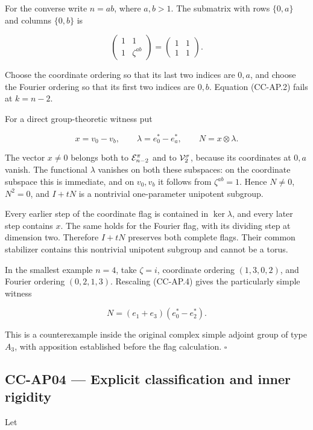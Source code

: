 \documentclass[11pt,a4paper]{article}
\theoremstyle{definition}\newtheorem{definition}[theorem]{Definition}
\theoremstyle{remark}\newtheorem{remark}[theorem]{Remark}
\begin{document}
For the converse write \(n=ab\), where \(a,b>1\). The submatrix with
rows \(\{0,a\}\) and columns \(\{0,b\}\) is

\[
 \begin{pmatrix}1&1\\1&\zeta^{ab}\end{pmatrix}
 =\begin{pmatrix}1&1\\1&1\end{pmatrix}.
\]

Choose the coordinate ordering so that its last two indices are \(0,a\),
and choose the Fourier ordering so that its first two indices are
\(0,b\). Equation (CC-AP.2) fails at \(k=n-2\).

For a direct group-theoretic witness put

\[
 x=v_0-v_b,\qquad
 \lambda=e_0^*-e_a^*,\qquad
 N=x\otimes\lambda.
 \tag{CC-AP.4}
\]

The vector \(x\ne0\) belongs both to \({\cal E}_{n-2}^{\pi}\) and to
\({\cal V}_2^\sigma\), because its coordinates at \(0,a\) vanish. The
functional \(\lambda\) vanishes on both these subspaces: on the
coordinate subspace this is immediate, and on \(v_0,v_b\) it follows
from \(\zeta^{ab}=1\). Hence \(N\ne0\), \(N^2=0\), and \(I+tN\) is a
nontrivial one-parameter unipotent subgroup.

Every earlier step of the coordinate flag is contained in
\(\ker\lambda\), and every later step contains \(x\). The same holds for
the Fourier flag, with its dividing step at dimension two. Therefore
\(I+tN\) preserves both complete flags. Their common stabilizer contains
this nontrivial unipotent subgroup and cannot be a torus.

In the smallest example \(n=4\), take \(\zeta=i\), coordinate ordering
\((1,3,0,2)\), and Fourier ordering \((0,2,1,3)\). Rescaling (CC-AP.4)
gives the particularly simple witness

\[
 N=(e_1+e_3)(e_0^*-e_2^*).
\]

This is a counterexample inside the original complex simple adjoint
group of type \(A_3\), with apposition established before the flag
calculation. \(\square\)

\subsection{CC-AP04 --- Explicit classification and inner
rigidity}\label{cc-ap04-explicit-classification-and-inner-rigidity}

Let
\end{document}
